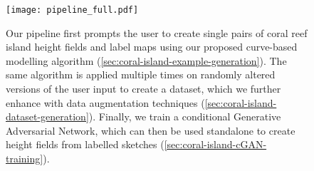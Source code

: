 \begin{figure}[H]
    \texttt{[image: pipeline\_full.pdf]}
    \caption[\cref{chap:coral-island}'s pipeline]{Our pipeline first prompts the user to create single pairs of coral reef island height fields and label maps using our proposed curve-based modelling algorithm (\cref{sec:coral-island-example-generation}). The same algorithm is applied multiple times on randomly altered versions of the user input to create a dataset, which we further enhance with data augmentation techniques (\cref{sec:coral-island-dataset-generation}). Finally, we train a conditional Generative Adversarial Network, which can then be used standalone to create height fields from labelled sketches (\cref{sec:coral-island-cGAN-training}).}
    \label{fig:coral-island-pipeline}
\end{figure}










